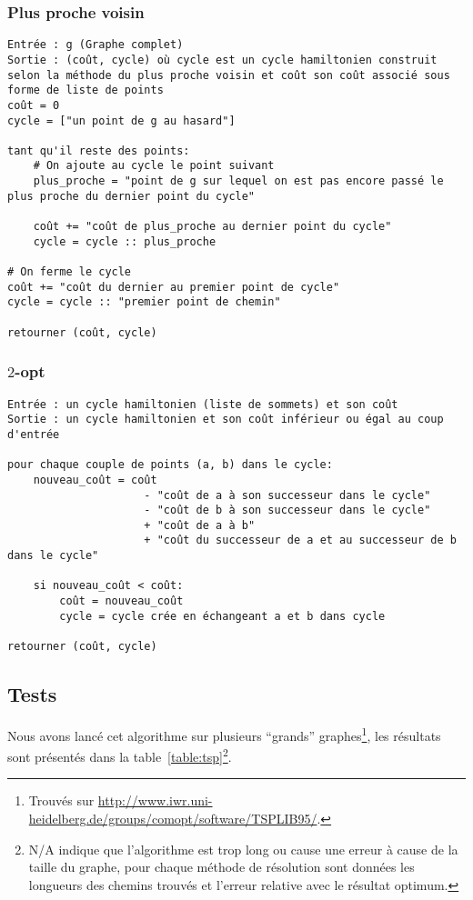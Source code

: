 \documentclass{scrartcl}
\begin{document}
    \subsubsection{Plus proche voisin}
      \begin{lstlisting}
Entrée : g (Graphe complet)
Sortie : (coût, cycle) où cycle est un cycle hamiltonien construit selon la méthode du plus proche voisin et coût son coût associé sous forme de liste de points
coût = 0
cycle = ["un point de g au hasard"]

tant qu'il reste des points:
    # On ajoute au cycle le point suivant
    plus_proche = "point de g sur lequel on est pas encore passé le plus proche du dernier point du cycle"

    coût += "coût de plus_proche au dernier point du cycle"
    cycle = cycle :: plus_proche

# On ferme le cycle
coût += "coût du dernier au premier point de cycle"
cycle = cycle :: "premier point de chemin"

retourner (coût, cycle)
      \end{lstlisting}

    \subsubsection{$2$-opt}
      \begin{lstlisting}
Entrée : un cycle hamiltonien (liste de sommets) et son coût
Sortie : un cycle hamiltonien et son coût inférieur ou égal au coup d'entrée

pour chaque couple de points (a, b) dans le cycle:
    nouveau_coût = coût
                     - "coût de a à son successeur dans le cycle"
                     - "coût de b à son successeur dans le cycle"
                     + "coût de a à b"
                     + "coût du successeur de a et au successeur de b dans le cycle"

    si nouveau_coût < coût:
        coût = nouveau_coût
        cycle = cycle crée en échangeant a et b dans cycle

retourner (coût, cycle)
      \end{lstlisting}

  \subsection{Tests}
    Nous avons lancé cet algorithme sur plusieurs ``grands''
    graphes\footnote{Trouvés sur
      \url{http://www.iwr.uni-heidelberg.de/groups/comopt/software/TSPLIB95/}.
    }, les résultats sont présentés dans la table~\ref{table:tsp}\footnote{N/A
    indique que l'algorithme est trop long ou cause une erreur à cause de la
    taille du graphe, pour chaque méthode de résolution sont données les
    longueurs des chemins trouvés et l'erreur relative avec le résultat
    optimum.}.
\end{document}

